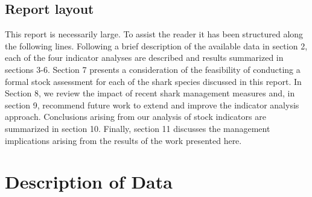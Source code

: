 \documentclass[12pt]{SCreport}
\begin{document}
\subsection{Report layout}
This report is necessarily large. To assist the reader it has been structured along the following lines. Following a brief description of the available data in section 2, each of the four indicator analyses are described and results summarized in sections 3-6. Section 7 presents a consideration of the feasibility of conducting a formal stock assessment for each of the shark species discussed in this report.  In Section 8, we review the impact of recent shark management measures and, in section 9, recommend future work to extend and improve the indicator analysis approach.  Conclusions arising from our analysis of stock indicators are summarized in section 10.  Finally, section 11 discusses the management implications arising from the results of the work presented here.

\section{Description of Data}
\end{document}
